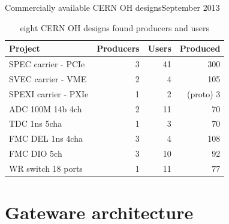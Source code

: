 \documentclass[compress,red]{beamer}
\begin{document}
\begin{frame}{Commercially available CERN OH designs}{September 2013}

  \begin{table}
    \centering

    \begin{tabular}{|l||r|r|r|}
      \hline
      Project & Producers & Users & Produced\\
      \hline\hline
      SPEC carrier - PCIe & 3 & 41 & 300 \\
      \hline
      SVEC carrier - VME & 2 & 4 & 105 \\
      \hline
      SPEXI carrier - PXIe & 1 & 2 & (proto) 3 \\
      \hline
      \hline
      ADC 100M 14b 4ch & 2 & 11 & 70 \\
      \hline
      TDC 1ns 5cha & 1 & 3 & 70 \\
      \hline
      FMC DEL 1ns 4cha & 3 & 4 & 108 \\
      \hline
      FMC DIO 5ch & 3 & 10 & 92 \\
      \hline
      \hline
      WR switch 18 ports & 1 & 11 & 77\\
      \hline
    \end{tabular}

    \caption{eight CERN OH designs found producers and users}
  \end{table}

  \note[item]{}

\end{frame}


\section{Gateware architecture}

\subsection*{} %
\end{document}
